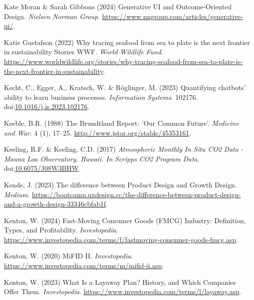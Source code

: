 \documentclass[
  letterpaper,
  DIV=11,
  numbers=noendperiod]{scrartcl}
\newlength{\cslhangindent}
\newenvironment{CSLReferences}[2] %
 {\begin{list}{}{%
  \setlength{\itemindent}{0pt}
  \setlength{\leftmargin}{0pt}
  \setlength{\parsep}{0pt}
  \ifodd #1
   \setlength{\leftmargin}{\cslhangindent}
   \setlength{\itemindent}{-1\cslhangindent}
  \fi
  \setlength{\itemsep}{#2\baselineskip}}}
 {\end{list}}
\begin{document}
\begin{CSLReferences}{0}{1}
Kate Moran \& Sarah Gibbons (2024) Generative {UI} and {Outcome-Oriented
Design}. \emph{Nielsen Norman Group}.
\url{https://www.nngroup.com/articles/generative-ui/}.

Katie Gustafson (2022) Why tracing seafood from sea to plate is the next
frontier in sustainability {\textbar} {Stories} {\textbar} {WWF}.
\emph{World Wildlife Fund}.
\url{https://www.worldwildlife.org/stories/why-tracing-seafood-from-sea-to-plate-is-the-next-frontier-in-sustainability}.

Kecht, C., Egger, A., Kratsch, W. \& Röglinger, M. (2023) Quantifying
chatbots' ability to learn business processes. \emph{Information
Systems}. 102176.
doi:\href{https://doi.org/10.1016/j.is.2023.102176}{10.1016/j.is.2023.102176}.

Keeble, B.R. (1988) The {Brundtland Report}: '{Our Common Future}'.
\emph{Medicine and War}. 4 (1), 17--25.
\url{http://www.jstor.org/stable/45353161}.

Keeling, R.F. \& Keeling, C.D. (2017) \emph{Atmospheric {Monthly In Situ
CO2 Data} - {Mauna Loa Observatory}, {Hawaii}. {In Scripps CO2 Program
Data}}. doi:\href{https://doi.org/10.6075/J08W3BHW}{10.6075/J08W3BHW}.

Kende, J. (2023) The difference between {Product Design} and {Growth
Design}. \emph{Medium}.
\url{https://bootcamp.uxdesign.cc/the-difference-between-product-design-and-a-growth-design-33346cbfab1f}.

Kenton, W. (2024) Fast-{Moving Consumer Goods} ({FMCG}) {Industry}:
{Definition}, {Types}, and {Profitability}. \emph{Investopedia}.
\url{https://www.investopedia.com/terms/f/fastmoving-consumer-goods-fmcg.asp}.

Kenton, W. (2020) {MiFID II}. \emph{Investopedia}.
\url{https://www.investopedia.com/terms/m/mifid-ii.asp}.

Kenton, W. (2023) What {Is} a {Layaway Plan}? {History}, and {Which
Companies Offer Them}. \emph{Investopedia}.
\url{https://www.investopedia.com/terms/l/layaway.asp}.


\end{CSLReferences}
\end{document}
